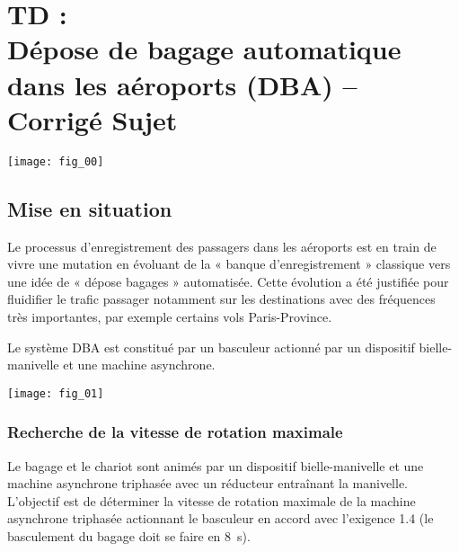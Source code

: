 \chapter*{TD  :\\ 
Dépose de bagage automatique dans les aéroports (DBA) -- \ifprof Corrigé \else Sujet \fi}

\iflivret {} \else
\ifprof  {} \else \fi
\fi

\setcounter{question}{0}

\begin{marginfigure}
\texttt{[image: fig\_00]}
\end{marginfigure}



\section*{Mise en situation}
\ifprof
\else
\fi

\ifprof
\else
Le processus d’enregistrement des passagers dans les aéroports est en train de
vivre une mutation en évoluant de la « banque d’enregistrement » classique vers une idée de « dépose bagages »
automatisée. Cette évolution a été justifiée pour fluidifier le trafic passager notamment sur les destinations avec
des fréquences très importantes, par exemple certains vols Paris-Province.


Le système DBA est constitué par un basculeur actionné par un dispositif bielle-manivelle et une machine
asynchrone.


\begin{center}
\texttt{[image: fig\_01]}
\end{center}

\fi

\subsection*{Recherche de la vitesse de rotation maximale}
\begin{obj} 
Le bagage et le chariot sont animés par un dispositif bielle-manivelle et une machine asynchrone
triphasée avec un réducteur entraînant la manivelle. L’objectif est de déterminer la vitesse de rotation
maximale de la machine asynchrone triphasée actionnant le basculeur en accord avec l’exigence 1.4
(le basculement du bagage doit se faire en \SI{8}{s}).
\end{obj}

